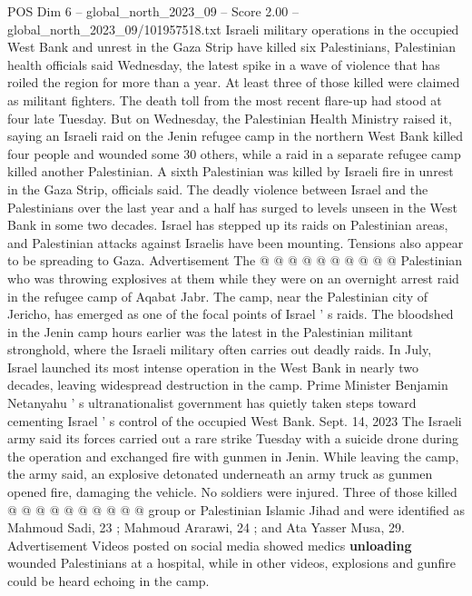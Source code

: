 \begin{textsample}{POS Dim 6 – global\_north\_2023\_09 – Score 2.00 – global\_north\_2023\_09/101957518.txt}  \label{ex:f6_pos_104}
Israeli military operations in the occupied West Bank and unrest in the Gaza Strip have killed six Palestinians, Palestinian health officials said Wednesday, the latest spike in a wave of violence that has roiled the region for more than a year.
At least three of those killed were claimed as militant fighters.
The death toll from the most recent flare-up had stood at four late Tuesday.
But on Wednesday, the Palestinian Health Ministry raised it, saying an Israeli raid on the Jenin refugee camp in the northern West Bank killed four people and wounded some 30 others, while a raid in a separate refugee camp killed another Palestinian.
A sixth Palestinian was killed by Israeli fire in unrest in the Gaza Strip, officials said.
The deadly violence between Israel and the Palestinians over the last year and a half has surged to levels unseen in the West Bank in some two decades.
Israel has stepped up its raids on Palestinian areas, and Palestinian attacks against Israelis have been mounting.
Tensions also appear to be spreading to Gaza.
Advertisement The @ @ @ @ @ @ @ @ @ @ Palestinian who was throwing explosives at them while they were on an overnight arrest raid in the refugee camp of Aqabat Jabr.
The camp, near the Palestinian city of Jericho, has emerged as one of the focal points of Israel ' s raids.
The bloodshed in the Jenin camp hours earlier was the latest in the Palestinian militant stronghold, where the Israeli military often carries out deadly raids.
In July, Israel launched its most intense operation in the West Bank in nearly two decades, leaving widespread destruction in the camp.
Prime Minister Benjamin Netanyahu ' s ultranationalist government has quietly taken steps toward cementing Israel ' s control of the occupied West Bank.
Sept. 14, 2023 The Israeli army said its forces carried out a rare strike Tuesday with a suicide drone during the operation and exchanged fire with gunmen in Jenin.
While leaving the camp, the army said, an explosive detonated underneath an army truck as gunmen opened fire, damaging the vehicle.
No soldiers were injured.
Three of those killed @ @ @ @ @ @ @ @ @ @ group or Palestinian Islamic Jihad and were identified as Mahmoud Sadi, 23 ; Mahmoud Ararawi, 24 ; and Ata Yasser Musa, 29.
Advertisement Videos posted on social media showed medics \textbf{unloading} wounded Palestinians at a hospital, while in other videos, explosions and gunfire could be heard echoing in the camp.

\end{textsample}
